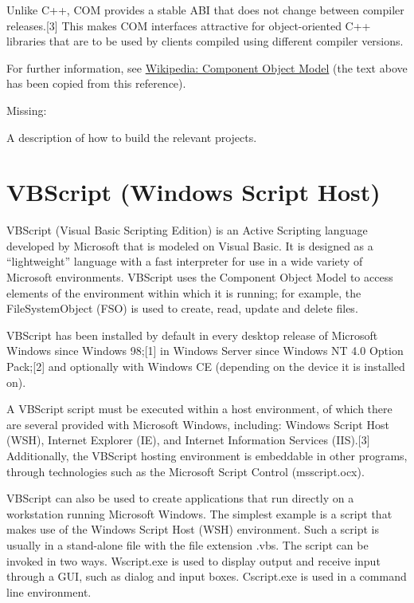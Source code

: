 \vpara
Unlike C++, COM provides a stable ABI that does not change between compiler releases.[3] This makes COM interfaces attractive for object-oriented C++ libraries that are to be used by clients compiled using different compiler versions.

\vpara
For further information, see \href{http://en.wikipedia.org/wiki/Component_Object_Model}{Wikipedia: Component Object Model} (the text above has been copied from this reference).

\vpara
Missing:

A description of how to build the relevant projects.




\newpage
\section{VBScript (Windows Script Host)}
VBScript (Visual Basic Scripting Edition) is an Active Scripting language developed by Microsoft that is modeled on Visual Basic. It is designed as a “lightweight” language with a fast interpreter for use in a wide variety of Microsoft environments. VBScript uses the Component Object Model to access elements of the environment within which it is running; for example, the FileSystemObject (FSO) is used to create, read, update and delete files.

\vpara
VBScript has been installed by default in every desktop release of Microsoft Windows since Windows 98;[1] in Windows Server since Windows NT 4.0 Option Pack;[2] and optionally with Windows CE (depending on the device it is installed on).

\vpara
A VBScript script must be executed within a host environment, of which there are several provided with Microsoft Windows, including: Windows Script Host (WSH), Internet Explorer (IE), and Internet Information Services (IIS).[3] Additionally, the VBScript hosting environment is embeddable in other programs, through technologies such as the Microsoft Script Control (msscript.ocx).

\vpara
VBScript can also be used to create applications that run directly on a workstation running Microsoft Windows. The simplest example is a script that makes use of the Windows Script Host (WSH) environment. Such a script is usually in a stand-alone file with the file extension .vbs. The script can be invoked in two ways. Wscript.exe is used to display output and receive input through a GUI, such as dialog and input boxes. Cscript.exe is used in a command line environment.

